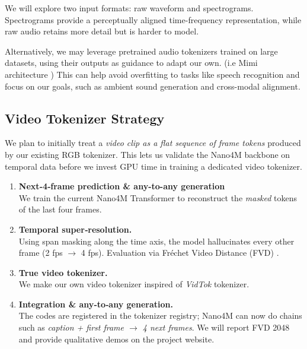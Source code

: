 \documentclass[10pt,conference,compsocconf]{IEEEtran}
\begin{document}
We will explore two input formats: raw waveform and spectrograms. Spectrograms provide a perceptually aligned time-frequency representation, while raw audio retains more detail but is harder to model.

Alternatively, we may leverage pretrained audio tokenizers trained on large datasets, using their outputs as guidance to adapt our own. (i.e Mimi architecture \cite{defossez_moshi_2024}) This can help avoid overfitting to tasks like speech recognition and focus on our goals, such as ambient sound generation and cross-modal alignment.


\subsection{Video Tokenizer Strategy}

We plan to initially treat a
\emph{video clip as a flat sequence of frame tokens} produced by our existing RGB
tokenizer.  This lets us validate the Nano4M backbone on temporal data before we
invest GPU time in training a dedicated video tokenizer.

\begin{enumerate}
    \item \textbf{Next‑4‑frame prediction \& any-to-any generation}\\
          We train the current Nano4M Transformer to reconstruct the \emph{masked} tokens of the last four frames.
    \item \textbf{Temporal super‑resolution.}\\
          Using span masking along the time axis, the model hallucinates every other frame (2 fps $\rightarrow$ 4 fps).  Evaluation via Fréchet Video Distance (FVD) \cite{unterthiner_towards_2019}.
    \item \textbf{True video tokenizer.}\\
          We make our own video tokenizer inspired of \emph{VidTok} \cite{tang_vidtok_2024} tokenizer.
    \item \textbf{Integration \& any‑to‑any generation.}\\
          The codes are registered in the tokenizer registry; Nano4M can now do chains such as \emph{caption + first frame $\rightarrow$ 4 next frames}.
          We will report FVD 2048 and provide qualitative demos on the project website.
\end{enumerate}
\end{document}
